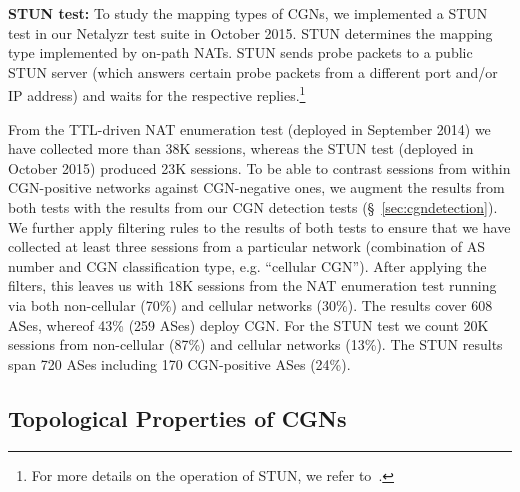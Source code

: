 \documentclass[10pt]{sig-alternate-05-2015}
\newcommand\xref[1]{\S~\ref{#1}}
\newcommand{\parax}[1]{\vspace{0.2em} \noindent \textbf{#1:}}
\begin{document}
\begin{table}
\center 
\footnotesize
{}
\caption{Detection rate of TTL-driven NAT enumeration.}
\label{table:ttltestnumbers}
\end{table}

\parax{STUN test} To study the mapping types of CGNs, we implemented a 
STUN~\cite{rfc5389} test in our Netalyzr test suite in October 2015. 
STUN determines the mapping type implemented by on-path NATs. STUN sends probe 
packets to a public STUN server (which answers certain probe packets from a 
different port and/or IP address) and waits for the respective 
replies.\footnote{For more details on the operation of STUN, we refer 
to~\cite{rfc5389}.}

From the TTL-driven NAT enumeration test (deployed in September 2014) we have 
collected more than 38K{} sessions, whereas the STUN
test (deployed in October 2015) produced 23K{} 
sessions. 
To be able to contrast sessions from within CGN-positive networks against 
CGN-negative ones, we augment the results from both tests with the 
results from our CGN detection tests (\xref{sec:cgndetection}).
We further apply filtering rules to the results of both tests to ensure 
that we have collected at least three sessions from a particular network 
(combination of AS number and CGN classification type, e.g. 
``cellular CGN''). After applying the 
filters, this leaves us with 18K{} sessions from the NAT 
enumeration test running via both non-cellular (70\%{})
and cellular networks (30\%{}).
The results cover 608{} ASes, whereof 43\%{} 
(259{} ASes) deploy CGN.
For the STUN test we count 20K{} sessions from non-cellular
(87\%{}) and cellular networks (13\%{}).
The STUN results span 720{} ASes including 170{} 
CGN-positive ASes (24\%{}).





\subsection{Topological Properties of CGNs}
\label{sec:cgnlocation}
\end{document}
